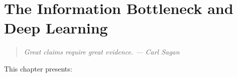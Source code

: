 

\chapter{The Information Bottleneck and Deep Learning}\label{ch:ib_and_dl}

\begin{quotation}
	\small \textit{ \flushright
	Great claims require great evidence.
	\flushright --- Carl Sagan \\
	\vspace{1cm}}
\end{quotation}


This chapter presents:
